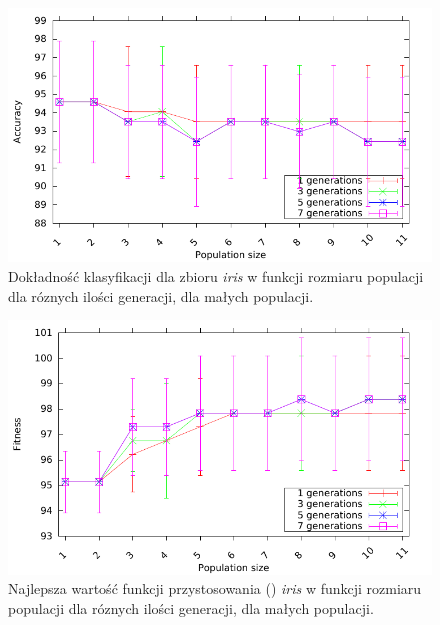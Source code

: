 %	
	\begin{figure}
		\includegraphics[scale=0.90]{figures/results/accuracy/accuracy-iris-detailed}
		\caption{Dokładność klasyfikacji dla zbioru \emph{iris} w funkcji rozmiaru populacji dla róznych ilości generacji, dla małych populacji.	\label{fig:acc-iris-detailed}}
	\end{figure}	
	
	
	\begin{figure}
		\includegraphics[scale=0.90]{figures/results/fitness/fitness-iris-detailed}
		\caption{Najlepsza wartość funkcji przystosowania ()  \emph{iris} w funkcji rozmiaru populacji dla róznych ilości generacji, dla małych populacji.	\label{fig:fit-iris-detailed}}
	\end{figure}	
	
